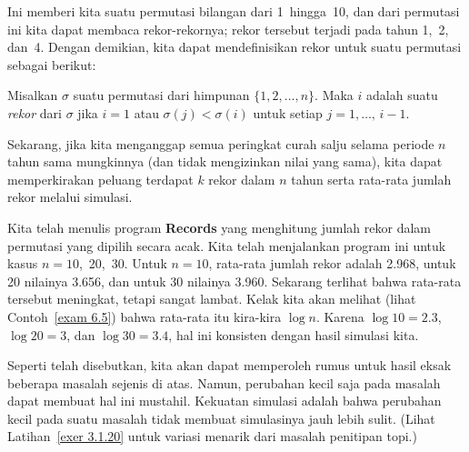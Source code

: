\begin{table}
\centering
{}
\caption{Peringkat curah salju total.}
\label{table 3.5}
\end{table}

Ini memberi kita suatu permutasi bilangan dari 1~hingga~10, dan dari permutasi ini kita
dapat membaca rekor-rekornya; rekor tersebut terjadi pada tahun 1,~2, dan~4.  Dengan
demikian, kita dapat mendefinisikan rekor untuk suatu permutasi sebagai berikut:

\begin{definition}\label{def 3.3} Misalkan $\sigma$ suatu permutasi dari himpunan
$\{1, 2, \ldots, n\}$.  Maka $i$ adalah suatu {\em rekor} dari $\sigma$ jika
$i = 1$ atau $\sigma(j) < \sigma(i)$ untuk setiap $j = 1,\ldots,\,i - 1$.
\end{definition}

Sekarang, jika kita menganggap semua peringkat curah salju selama periode $n$ tahun
sama mungkinnya (dan tidak mengizinkan nilai yang sama), kita dapat memperkirakan
peluang terdapat $k$ rekor dalam $n$ tahun serta rata-rata jumlah rekor melalui simulasi.
\par
Kita telah menulis program {\bf Records} yang menghitung jumlah
rekor dalam permutasi yang dipilih secara acak.  Kita telah menjalankan program ini
untuk kasus $n = 10$,~20,~30.  Untuk $n = 10$, rata-rata jumlah rekor adalah 2.968,
untuk 20 nilainya 3.656, dan untuk 30 nilainya 3.960.  Sekarang terlihat bahwa rata-rata
tersebut meningkat, tetapi sangat lambat.  Kelak kita akan melihat (lihat
Contoh~\ref{exam 6.5}) bahwa rata-rata itu kira-kira $\log n$.  Karena
$\log 10 = 2.3$,
$\log 20 = 3$, dan
$\log 30 = 3.4$, hal ini konsisten dengan hasil simulasi kita.
\par
Seperti telah disebutkan, kita akan dapat memperoleh rumus untuk hasil eksak beberapa
masalah sejenis di atas.  Namun, perubahan kecil saja pada masalah dapat membuat hal
ini mustahil.  Kekuatan simulasi adalah bahwa perubahan kecil pada suatu masalah tidak
membuat simulasinya jauh lebih sulit.  (Lihat Latihan~\ref{exer 3.1.20} untuk variasi
menarik dari masalah penitipan topi.)

